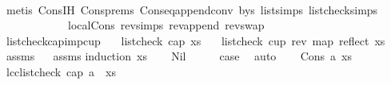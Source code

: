 \begin{isabellebody}
\ \ \ \ \ \ \ \ \ \ \ \ \ {}\ \isanewline
\ \ \ \ \ \ \ \ \isamarkupfalse%
\ {\isacharparenleft}{\kern0pt}metis\ Cons{\isachardot}{\kern0pt}IH\ Cons{\isachardot}{\kern0pt}prems\ Cons{\isacharunderscore}{\kern0pt}eq{\isacharunderscore}{\kern0pt}append{\isacharunderscore}{\kern0pt}conv\ b{\isacharunderscore}{\kern0pt}ys\ list{\isachardot}{\kern0pt}simps{\isacharparenleft}{\kern0pt}{}{\isacharparenright}{\kern0pt}\ list{\isacharunderscore}{\kern0pt}check{\isachardot}{\kern0pt}simps{\isacharparenleft}{\kern0pt}{}{\isacharparenright}{\kern0pt}\isanewline
\ \ \ \ \ \ \ \ \ \ \ \ local{\isachardot}{\kern0pt}Cons\ rev{\isachardot}{\kern0pt}simps{\isacharparenleft}{\kern0pt}{}{\isacharparenright}{\kern0pt}\ rev{\isacharunderscore}{\kern0pt}append\ rev{\isacharunderscore}{\kern0pt}swap{\isacharparenright}{\kern0pt}\ \ \ \isanewline
\ \ \ \ \isamarkupfalse%
\isanewline
\ \ \isamarkupfalse%
\isanewline
{}\isamarkupfalse%
%
\endisatagproof
{\isafoldproof}%
%
\isadelimproof
%
\endisadelimproof
\isanewline
\isanewline
\isanewline
{}\isamarkupfalse%
\ list{\isacharunderscore}{\kern0pt}check{\isacharunderscore}{\kern0pt}cap{}{\isacharunderscore}{\kern0pt}imp{\isacharunderscore}{\kern0pt}cup{}{\isacharcolon}{\kern0pt}\isanewline
\ \ \ {\isachardoublequoteopen}list{\isacharunderscore}{\kern0pt}check\ cap{}\ xs{\isachardoublequoteclose}\isanewline
\ \ \ {\isachardoublequoteopen}list{\isacharunderscore}{\kern0pt}check\ cup{}\ {\isacharparenleft}{\kern0pt}rev\ {\isacharparenleft}{\kern0pt}map\ reflect\ xs{\isacharparenright}{\kern0pt}{\isacharparenright}{\kern0pt}{\isachardoublequoteclose}%
\isadelimproof
\ %
\endisadelimproof
%
\isatagproof
{}\isamarkupfalse%
\ assms\isanewline
\ \isamarkupfalse%
\ assms\isanewline
{}\isamarkupfalse%
{\isacharparenleft}{\kern0pt}induction\ xs{\isacharparenright}{\kern0pt}\isanewline
\ \ \isamarkupfalse%
\ Nil\isanewline
\ \ \isamarkupfalse%
\ \isamarkupfalse%
\ {\isacharquery}{\kern0pt}case\ \isamarkupfalse%
\ auto\isanewline
{}\isamarkupfalse%
\isanewline
\ \ \isamarkupfalse%
\ {\isacharparenleft}{\kern0pt}Cons\ a\ xs{\isacharparenright}{\kern0pt}\isanewline
\ \ \isamarkupfalse%
\ lcc{\isacharcolon}{\kern0pt}{\isachardoublequoteopen}list{\isacharunderscore}{\kern0pt}check\ cap{}\ {\isacharparenleft}{\kern0pt}a\ {\isacharhash}{\kern0pt}\ xs{\isacharparenright}{\kern0pt}{\isachardoublequoteclose}\ \isamarkupfalse%

\end{isabellebody}
